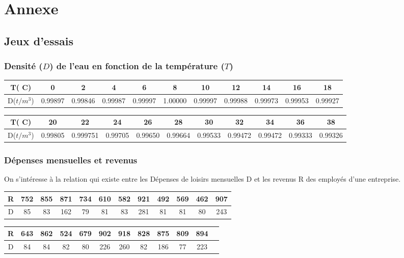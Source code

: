 \chapter*{Annexe}
\label{annexe}
\section*{Jeux d'essais}
\subsection*{Densité ($D$) de l'eau en fonction de la température ($T$)}
\centering
\begin{tabular}{|c|c|c|c|c|c|c|c|c|c|c|}
    \hline
    T( C) & 0 & 2 & 4 & 6 & 8 & 10 & 12 & 14 & 16 & 18 \\
    \hline
    D($t/m^3$) &0.99897&0.99846& 0.99987&0.99997&1.00000&0.99997&0.99988&0.99973&0.99953&0.99927\\
    \hline
\end{tabular}
\raggedright
\begin{tabular}{|c|c|c|c|c|c|c|c|c|c|c|}
    \hline
    T( C) & 20 & 22 & 24 & 26 & 28 & 30 & 32 & 34 & 36 & 38 \\
    \hline
    D($t/m^3$) &0.99805&0.999751&0.99705&0.99650&0.99664&0.99533&0.99472&0.99472&0.99333&0.99326 \\
    \hline
\end{tabular}

\subsection*{Dépenses mensuelles et revenus}
On s'intéresse à la relation qui existe entre les Dépenses de loisirs mensuelles D et les revenus R des employés d'une entreprise.\vspace{8pt}\\

\begin{tabular}{|c|c|c|c|c|c|c|c|c|c|c|c|}
    \hline
    R & 752 & 855 & 871 & 734 & 610 & 582 & 921 & 492 & 569 & 462 & 907\\
    \hline
    D &85&83&162&79&81&83&281&81&81&80&243\\
    \hline
\end{tabular}
\begin{tabular}{|c|c|c|c|c|c|c|c|c|c|c|c|}
    \hline
    R & 643&862&524&679&902&918&828&875&809&894&\\
    \hline
    D &84&84&82&80&226&260&82&186&77&223&\\
    \hline
\end{tabular}
